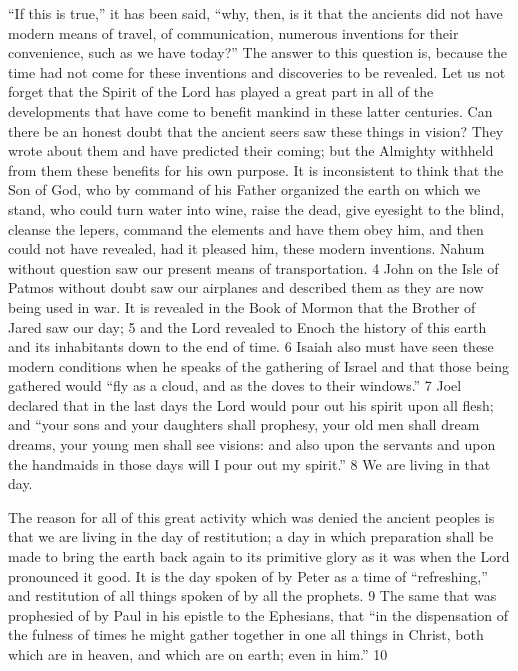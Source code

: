 ``If this is true,'' it has been said, ``why, then, is it that the ancients did not have modern means
of travel, of communication, numerous inventions for their convenience, such as we have
today?'' The answer to this question is, because the time had not come for these inventions
and discoveries to be revealed. Let us not forget that the Spirit of the Lord has played a great
part in all of the developments that have come to benefit mankind in these latter centuries.
Can there be an honest doubt that the ancient seers saw these things in vision? They wrote
about them and have predicted their coming; but the Almighty withheld from them these
benefits for his own purpose. It is inconsistent to think that the Son of God, who by
command of his Father organized the earth on which we stand, who could turn water into
wine, raise the dead, give eyesight to the blind, cleanse the lepers, command the elements
and have them obey him, and then could not have revealed, had it pleased him, these modern
inventions. Nahum without question saw our present means of transportation. 4 John on the
Isle of Patmos without doubt saw our airplanes and described them as they are now being
used in war. It is revealed in the Book of Mormon that the Brother of Jared saw our day; 5
and the Lord revealed to Enoch the history of this earth and its inhabitants down to the end of
time. 6 Isaiah also must have seen these modern conditions when he speaks of the gathering
of Israel and that those being gathered would ``fly as a cloud, and as the doves to their
windows.'' 7 Joel declared that in the last days the Lord would pour out his spirit upon all
flesh; and ``your sons and your daughters shall prophesy, your old men shall dream dreams,
your young men shall see visions: and also upon the servants and upon the handmaids in
those days will I pour out my spirit.'' 8 We are living in that day.

The reason for all of this great activity which was denied the ancient peoples is that we are
living in the day of restitution; a day in which preparation shall be made to bring the earth
back again to its primitive glory as it was when the Lord pronounced it good. It is the day
spoken of by Peter as a time of ``refreshing,'' and restitution of all things spoken of by all the
prophets. 9 The same that was prophesied of by Paul in his epistle to the Ephesians, that ``in
the dispensation of the fulness of times he might gather together in one all things in Christ,
both which are in heaven, and which are on earth; even in him.'' 10

